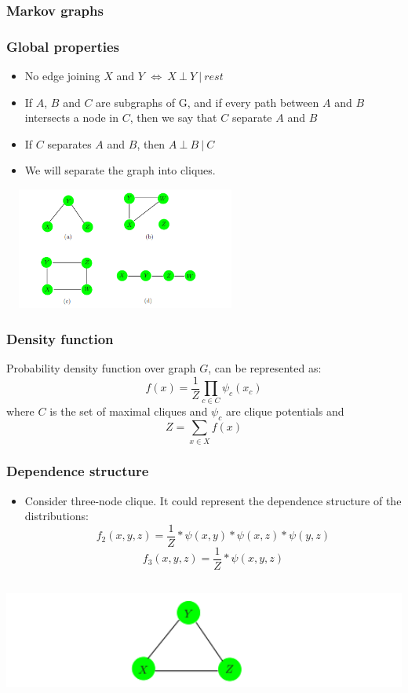 \documentclass{beamer}
\begin{document}
\begin{frame}
\frametitle{Markov graphs}
\end{frame}
\begin{frame}
\frametitle{Global properties}
  \begin{itemize}
      \item No edge joining $X$ and $Y$ $ \Leftrightarrow\ X\ \bot\ Y\ |\ rest$
      \item If $A$, $B$ and $C$ are subgraphs of G, and if every path between $A$ and $B$ intersects a node in $C$, then we say that $C$ separate $A$ and $B$
      \item If $C$ separates $A$ and $B$, then $A\ \bot\ B\ |\ C$
      \item We will separate the graph into
cliques. 
  \end{itemize}
  \includegraphics[width=8cm, height=4cm]{Graphs}
\end{frame}
\begin{frame}
\frametitle{Density function}
Probability density function over graph $G$, can be represented as:
\begin{equation}
f(x)=\frac{1}{Z}\prod_{c \in C}{\psi_c(x_c)}
\end{equation}
where $C$ is the set of maximal cliques and $\psi_c$ are clique potentials and \begin{equation}
Z=\sum_{x \in X} f(x)
\end{equation}
\end{frame}
\begin{frame}
\frametitle{Dependence structure}
\begin{itemize}
\item Consider three-node clique. It could represent the dependence structure of the distributions:
\begin{equation}
f_2(x,y,z)=\frac{1}{Z}*\psi(x,y)*\psi(x,z)*\psi(y,z)
\end{equation}
\begin{equation}
f_3(x,y,z)=\frac{1}{Z}*\psi(x,y,z)
\end{equation}
\end{itemize}
\includegraphics[width=15cm, height=4cm]{Graph}
\end{frame}
\end{document}
